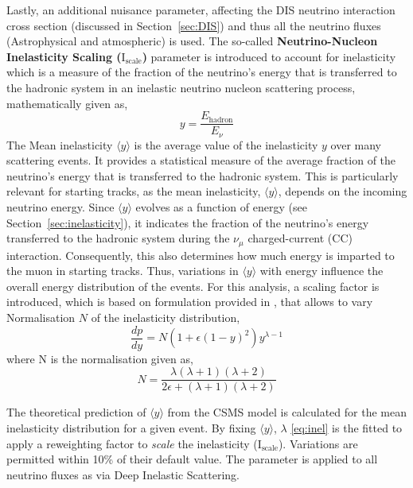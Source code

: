 Lastly, an additional nuisance parameter, affecting the DIS neutrino interaction cross section (discussed in Section~\ref{sec:DIS}) and thus all the neutrino fluxes (Astrophysical and atmospheric) is used. The so-called \textbf{Neutrino-Nucleon Inelasticity Scaling ($\mathrm{I}_{\mathrm{scale}}$)} parameter is introduced to account for  inelasticity which is a measure of the fraction of the neutrino's energy that is transferred to the hadronic system in an inelastic neutrino nucleon scattering process, mathematically given as,
\begin{equation}
     y  = \frac{E_{\text{hadron}}}{E_\nu}
\end{equation}
The Mean inelasticity $\langle y \rangle$ is the average value of the inelasticity $y$ over many scattering events. It provides a statistical measure of the average fraction of the neutrino's energy that is transferred to the hadronic system. This is particularly relevant for starting tracks, as the mean inelasticity, \(\langle y \rangle\), depends on the incoming neutrino energy. Since \(\langle y \rangle\) evolves as a function of energy (see Section~\ref{sec:inelasticity}), it indicates the fraction of the neutrino's energy transferred to the hadronic system during the \(\nu_{\mu}\) charged-current (CC) interaction. Consequently, this also determines how much energy is imparted to the muon in starting tracks. Thus, variations in \(\langle y \rangle\) with energy influence the overall energy distribution of the events. For this analysis, a scaling factor is introduced, which is based on formulation provided in , that allows to vary Normalisation $N$ of the inelasticity distribution, 
\begin{equation}
    \frac{dp}{dy} = N \left( 1 + \epsilon (1 - y)^2 \right) y^{\lambda - 1}
\end{equation}
where N is the normalisation given as,
\begin{equation}\label{eq:inel}
    N = \frac{\lambda (\lambda + 1) (\lambda + 2)}{2\epsilon + (\lambda + 1) (\lambda + 2)}
\end{equation}

The theoretical prediction of \(\langle y \rangle\) from the CSMS model  is calculated for the mean inelasticity distribution for a given event. By fixing \(\langle y \rangle\), $\lambda$ \ref{eq:inel} is the fitted to apply a reweighting factor to \textit{scale} the inelasticity ($\mathrm{I}_{\mathrm{scale}}$). Variations are permitted within 10\% of their default value. The parameter is applied to all neutrino fluxes as via Deep Inelastic Scattering.

